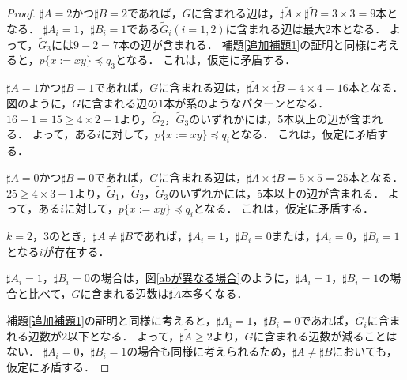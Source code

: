 \begin{proof}
$\sharp A=2$かつ$\sharp B=2$であれば，$G$に含まれる辺は，$\sharp\tilde{A} \times \sharp\tilde{B}=3 \times 3=9$本となる．
$\sharp A_{i}=1，\sharp B_{i}=1$である$\tilde{G}_{i} (i=1,2)$に含まれる辺は最大2本となる．
よって，$\tilde{G}_{3}$には$9-2=7$本の辺が含まれる．
補題\ref{追加補題1}の証明と同様に考えると，$p \{ x:= xy \} \preceq q_{3}$となる．
これは，仮定に矛盾する．

$\sharp A=1$かつ$\sharp B=1$であれば，$G$に含まれる辺は，$\sharp\tilde{A} \times \sharp\tilde{B}=4 \times 4=16$本となる．
図のように，$G$に含まれる辺の1本が系のようなパターンとなる．
$16-1=15 \ge 4 \times 2 + 1$より，$\tilde{G}_{2}，\tilde{G}_{3}$のいずれかには，5本以上の辺が含まれる．
よって，ある$i$に対して，$p \{ x:=xy \} \preceq q_{i}$となる．
これは，仮定に矛盾する．

$\sharp A=0$かつ$\sharp B=0$であれば，$G$に含まれる辺は，$\sharp\tilde{A} \times \sharp\tilde{B}=5 \times 5=25$本となる．
$25 \ge 4 \times 3 + 1$より，$\tilde{G}_{1}，\tilde{G}_{2}，\tilde{G}_{3}$のいずれかには，5本以上の辺が含まれる．
よって，ある$i$に対して，$p \{ x:=xy \} \preceq q_{i}$となる．
これは，仮定に矛盾する．

$k=2，3$のとき，$\sharp A \not = \sharp B$であれば，$\sharp A_{i}=1，\sharp B_{i}=0$または，$\sharp A_{i} =0，\sharp B_{i}=1$となる$i$が存在する．

$\sharp A_{i}=1，\sharp B_{i}=0$の場合は，図\ref{abが異なる場合}のように，$\sharp A_{i} =1，\sharp B_{i}=1$の場合と比べて，$G$に含まれる辺数は$\sharp\tilde{A}$本多くなる．

補題\ref{追加補題1}の証明と同様に考えると，$\sharp A_{i}=1，\sharp B_{i}=0$であれば，$\tilde{G}_{i}$に含まれる辺数が2以下となる．
よって，$\sharp\tilde{A} \ge 2$より，$G$に含まれる辺数が減ることはない．
$\sharp A_{i}=0，\sharp B_{i}=1$の場合も同様に考えられるため，$\sharp A \not = \sharp B$においても，仮定に矛盾する．
\end{proof}


